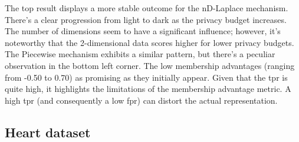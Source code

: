 The top result displays a more stable outcome for the nD-Laplace mechanism. There's a clear progression from light to dark as the privacy budget increases. The number of dimensions  seem to have a significant influence; however, it's noteworthy that the 2-dimensional data scores higher for lower privacy budgets. The Piecewise mechanism exhibits a similar pattern, but there's a peculiar observation in the bottom left corner. The low membership advantages (ranging from -0.50 to 0.70)  as promising as they initially appear. Given that the \gls{tpr} is quite high, it highlights the limitations of the membership advantage metric. A high \gls{tpr} (and consequently a low \gls{fpr}) can distort the actual representation.

\newpage
\subsection{Heart dataset}
